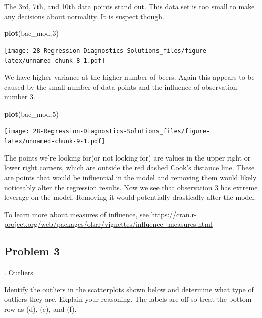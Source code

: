 \documentclass[
]{book}
\newenvironment{Shaded}{\begin{snugshade}}{\end{snugshade}}
\newcommand{\DecValTok}[1]{\textcolor[rgb]{0.00,0.00,0.81}{#1}}
\newcommand{\KeywordTok}[1]{\textcolor[rgb]{0.13,0.29,0.53}{\textbf{#1}}}
\newcommand{\NormalTok}[1]{#1}
\begin{document}
The 3rd, 7th, and 10th data points stand out. This data set is too small to make any decisions about normality. It is suspect though.

\begin{Shaded}
\begin{Highlighting}[]
\KeywordTok{plot}\NormalTok{(bac_mod,}\DecValTok{3}\NormalTok{)}
\end{Highlighting}
\end{Shaded}

\texttt{[image: 28-Regression-Diagnostics-Solutions\_files/figure-latex/unnamed-chunk-8-1.pdf]}

We have higher variance at the higher number of beers. Again this appears to be caused by the small number of data points and the influence of observation number 3.

\begin{Shaded}
\begin{Highlighting}[]
\KeywordTok{plot}\NormalTok{(bac_mod,}\DecValTok{5}\NormalTok{)}
\end{Highlighting}
\end{Shaded}

\texttt{[image: 28-Regression-Diagnostics-Solutions\_files/figure-latex/unnamed-chunk-9-1.pdf]}

The points we're looking for(or not looking for) are values in the upper right or lower right corners, which are outside the red dashed Cook's distance line. These are points that would be influential in the model and removing them would likely noticeably alter the regression results. Now we see that observation 3 has extreme leverage on the model. Removing it would potentially drastically alter the model.

To learn more about measures of influence, see \url{https://cran.r-project.org/web/packages/olsrr/vignettes/influence_measures.html}

\hypertarget{problem-3-19}{%
\subsection{Problem 3}\label{problem-3-19}}

. Outliers

Identify the outliers in the scatterplots shown below and determine what type of outliers they are. Explain your reasoning. The labels are off so treat the bottom row as (d), (e), and (f).
\end{document}
